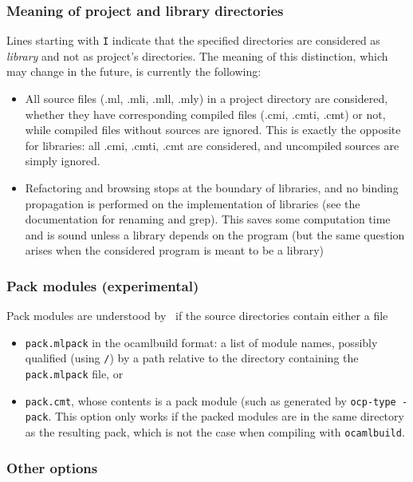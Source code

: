 \subsubsection*{Meaning of project and library directories}
Lines starting with
\verb!I! indicate that the specified directories are considered as
\emph{library} and not as project's directories. The meaning of this
distinction, which may change in the future, is currently the
following:
\begin{itemize}
\item All source files (.ml, .mli, .mll, .mly) in a project directory
  are considered, whether they have corresponding compiled files
  (.cmi, .cmti, .cmt) or not, while compiled files without sources are
  ignored. This is exactly the opposite for libraries: all .cmi,
  .cmti, .cmt are considered, and uncompiled sources are simply
  ignored.
\item Refactoring and browsing stops at the boundary of libraries, and
  no binding propagation is performed on the implementation of
  libraries (see the documentation for renaming and grep). This saves
  some computation time and is sound unless a library depends on the
  program (but the same question arises when the considered program is
  meant to be a library)
\end{itemize}

\subsubsection*{Pack modules (experimental)}
Pack modules are understood by
\typerex\ if the source directories contain either a file
\begin{itemize}
\item \verb!pack.mlpack! in the ocamlbuild format: a list of module
  names, possibly qualified (using \verb!/!) by a path relative to the
  directory containing the \verb!pack.mlpack! file, or
\item \verb!pack.cmt!, whose contents is a pack module (such as
  generated by \verb!ocp-type -pack!. This option only works if the
  packed modules are in the same directory as the resulting pack,
  which is not the case when compiling with \verb!ocamlbuild!.
\end{itemize}

\subsubsection*{Other options}

